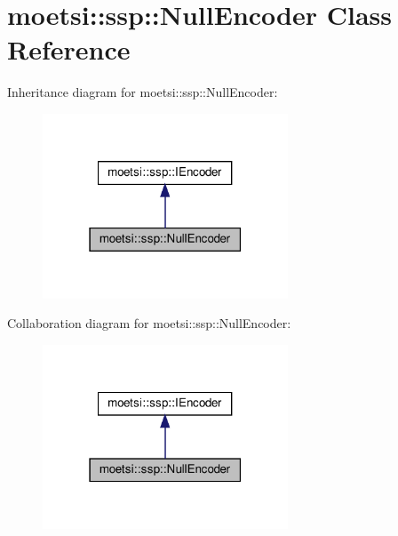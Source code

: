 \hypertarget{classmoetsi_1_1ssp_1_1NullEncoder}{}\section{moetsi\+:\+:ssp\+:\+:Null\+Encoder Class Reference}
\label{classmoetsi_1_1ssp_1_1NullEncoder}


Inheritance diagram for moetsi\+:\+:ssp\+:\+:Null\+Encoder\+:
\nopagebreak
\begin{figure}[H]
\begin{center}
\leavevmode
\includegraphics[width=207pt]{classmoetsi_1_1ssp_1_1NullEncoder__inherit__graph}
\end{center}
\end{figure}


Collaboration diagram for moetsi\+:\+:ssp\+:\+:Null\+Encoder\+:
\nopagebreak
\begin{figure}[H]
\begin{center}
\leavevmode
\includegraphics[width=207pt]{classmoetsi_1_1ssp_1_1NullEncoder__coll__graph}
\end{center}
\end{figure}
